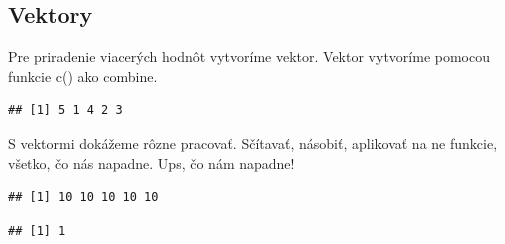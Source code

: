 \hypertarget{vektory}{%
\subsection{Vektory}\label{vektory}}

Pre priradenie viacerých hodnôt vytvoríme vektor. Vektor vytvoríme
pomocou funkcie c() ako combine.

\begin{Shaded}
\begin{Highlighting}[]
\StringTok{ }\NormalTok{(}\NormalTok{, }\NormalTok{, }\NormalTok{, }\NormalTok{, }\NormalTok{)}

\end{Highlighting}
\end{Shaded}

\begin{verbatim}
## [1] 5 1 4 2 3
\end{verbatim}

S vektormi dokážeme rôzne pracovať. Sčítavať, násobiť, aplikovať na ne
funkcie, všetko, čo nás napadne. Ups, čo nám napadne!

\begin{Shaded}
\begin{Highlighting}[]
\StringTok{ }\NormalTok{(}\NormalTok{, }\NormalTok{, }\NormalTok{, }\NormalTok{, }\NormalTok{)}
\OperatorTok{+}\StringTok{ }
\end{Highlighting}
\end{Shaded}

\begin{verbatim}
## [1] 10 10 10 10 10
\end{verbatim}

\begin{Shaded}
\begin{Highlighting}[]
\end{Highlighting}
\end{Shaded}

\begin{verbatim}
## [1] 1
\end{verbatim}

\begin{Shaded}
\begin{Highlighting}[]
\end{Highlighting}
\end{Shaded}

